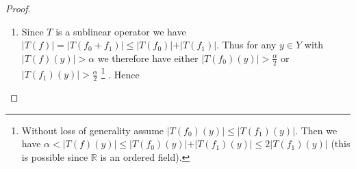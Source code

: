 \begin{proof}
\begin{enumerate}[label = \textbf{(\roman*.)}]
\begin{enumerate}[label = \textbf{\alph*.}]
	\begin{proof}
		Assume $\chi_A$ is measurable. Then $\mathrm{Re}\chi_A$ and $\mathrm{Im}\chi_A$ are measurable. Especially for $0 < \lambda < 1$ we have that $\{\mathrm{Re}\chi_A > \lambda\} = A \in \mathcal{A}$. Conversly, assume $A$ is measurable. For $\lambda \in \mathbb{R}_{<0}$ we have $\{\mathrm{Re}\chi_A > \lambda\} = X \in \mathcal{A}$, $\lambda \in [0,1[$, $\{\mathrm{Re}\chi_A > \lambda\} = A \in \mathcal{A}$ and $\{\mathrm{Re}\chi_A > \lambda\} = \emptyset \in \mathcal{A}$ for $\lambda \in \mathbb{R}_{\geqslant 1}$. Since $\mathrm{Im}\chi_A \equiv 0$ we have $\{\mathrm{Im}\chi_A > \lambda \} = X \in \mathcal{A}$ if $\lambda \in \mathbb{R}_{<0}$ and $\{\mathrm{Im}\chi_A > \lambda\} = \emptyset \in \mathcal{A}$ if $\lambda \in \mathbb{R}_{\geqslant 0}$.   
	\end{proof}

	\vspace{2mm}
	
	By Lemma \ref{lemma:charfun} and the fact that $f \cdot g$ is measurable for two measurable functions $f,g: (X,\mathcal{A}) \rightarrow (\mathbb{C},\mathfrak{B}^2)$\footcite[107]{elstrodt:mass:2011}, $f_0$ and $f_1$ are measurable since $f_0 \equiv f \cdot \chi_{\{\vert f \vert > \delta \alpha\}}$ and $f_1 \equiv f \cdot \chi_{\{\vert f \vert \leqslant \delta \alpha\}}$.\\

	One subtility is left to clear: the $\mu$-integrability of either $\vert f_1\vert^{p_0}$ or $\vert f_1 \vert^{p_1}$ requires that $\vert f_0 \vert^{p_0}$ and $\vert f_1 \vert^{p_1}$ are measurable functions. By the fact that any continuous map $g: (X,d_X) \rightarrow (Y,d_Y)$ between metric spaces is Borel-measurable (see \cite[86]{elstrodt:mass:2011}) and that the composition of measurable functions is again measurable (see \cite[87]{elstrodt:mass:2011}), the measurability of either $f_0$ or $f_1$ follows by $\vert f_0 \vert^{p_0} \equiv \cdot^{p_0} \circ \vert f \cdot \chi_{\{\vert f\vert > \delta\alpha\}}\vert$ and $\vert f_1 \vert^{p_1} \equiv \cdot^{p_1} \circ \vert f \cdot \chi_{\{\vert f \vert \leqslant \delta \alpha\}}\vert$ by stipulating $\cdot^{p}: (\mathbb{R}_{\geqslant 0},\vert \cdot \vert) \rightarrow (\mathbb{C},\vert \cdot \vert)$, $x^{p} := \exp(p \log(x))$ for $p > 0$ and $x \in \mathbb{R}_{> 0}$ and $x^p := 0$ if $x = 0$.

	\item Since $T$ is a sublinear operator we have $\vert T(f) \vert = \vert T(f_0 + f_1) \vert \leqslant \vert T(f_0) \vert + \vert T(f_1)\vert$. Thus for any $y \in Y$ with $\vert T(f)(y) \vert > \alpha$ we therefore have either $\vert T(f_0)(y) \vert > \frac{\alpha}{2}$ or $\vert T(f_1)(y) \vert > \frac{\alpha}{2}$ 
		\footnote{Without loss of generality assume $\vert T(f_0)(y) \vert \leqslant \vert T(f_1)(y) \vert $. Then we have $\alpha < \vert T(f)(y)\vert \leqslant \vert T(f_0)(y) \vert + \vert T(f_1)(y)\vert \leqslant 2\vert T(f_1)(y)\vert$ (this is possible since $\mathbb{R}$ is an ordered field).}
		. Hence


\end{enumerate}
\end{enumerate}
\end{proof}
